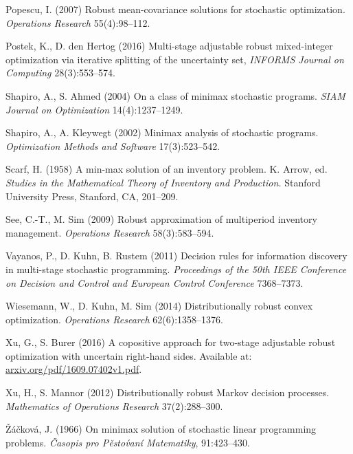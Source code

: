\documentclass[fleqn,mnsc,blindrev]{informs4}
\begin{document}
\begin{thebibliography}{}
			
			Popescu, I. (2007)
			Robust mean-covariance solutions for stochastic optimization. {\it Operations Research} 55(4):98--112.
			
			Postek, K., D. den Hertog (2016)
			Multi-stage adjustable robust mixed-integer optimization via iterative splitting of the uncertainty set, {\it INFORMS Journal on Computing} 28(3):553--574.
			
			
			Shapiro, A., S. Ahmed (2004)
			On a class of minimax stochastic programs. {\it SIAM Journal on Optimization} 14(4):1237--1249.
			
			Shapiro, A.,  A. Kleywegt (2002)
			Minimax analysis of stochastic programs.
			{\it Optimization Methods and Software} 17(3):523--542.
			
			
			Scarf, H. (1958)
			A min-max solution of an inventory problem. K. Arrow, ed. {\it Studies in the Mathematical Theory of Inventory and Production.} Stanford University Press, Stanford, CA, 201--209.
			
			See, C.-T., M. Sim (2009)
			Robust approximation of multiperiod inventory management.  {\it Operations Research} 58(3):583--594.
			
			
			Vayanos, P., D. Kuhn, B. Rustem (2011)
			Decision rules for information discovery in multi-stage stochastic programming. {\it Proceedings of the 50th IEEE Conference on Decision and Control and European Control Conference} 7368--7373.
			
			Wiesemann, W., D. Kuhn, M. Sim (2014)
			Distributionally robust convex optimization. {\it Operations Research} 62(6):1358--1376.
			
			Xu, G., S. Burer  (2016)
			A copositive approach for two-stage adjustable robust optimization with uncertain right-hand sides. Available at: { \url{arxiv.org/pdf/1609.07402v1.pdf}}.			
			
			Xu, H., S. Mannor (2012)
			Distributionally robust Markov decision processes. {\it Mathematics of Operations Research} 37(2):288--300.
			
			{\v Z}{\'a}{\v c}kov{\'a}, J. (1966)
			On minimax solution of stochastic linear programming problems.
			{\it {\v C}asopis pro P{\v e}sto\'{v}an\'{i} Matematiky},
			91:423--430.
			

\end{thebibliography}
\end{document}
